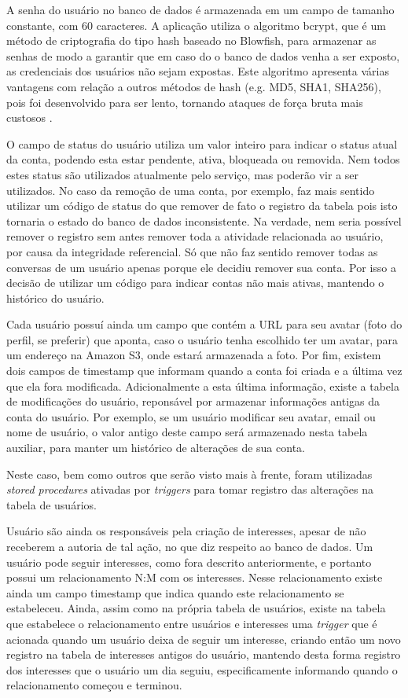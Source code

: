 \documentclass[diss]{template/setrem}
\begin{document}
A senha do usuário no banco de dados é armazenada em um campo de tamanho constante, com 60 caracteres. A aplicação utiliza o algoritmo bcrypt, que é um método de criptografia do tipo hash baseado no Blowfish, para armazenar as senhas de modo a garantir que em caso do o banco de dados venha a ser exposto, as credenciais dos usuários não sejam expostas. Este algoritmo apresenta várias vantagens com relação a outros métodos de hash (e.g. MD5, SHA1, SHA256), pois foi desenvolvido para ser lento, tornando ataques de força bruta mais custosos \citep{Hale2010}.

O campo de status do usuário utiliza um valor inteiro para indicar o status atual da conta, podendo esta estar pendente, ativa, bloqueada ou removida. Nem todos estes status são utilizados atualmente pelo serviço, mas poderão vir a ser utilizados. No caso da remoção de uma conta, por exemplo, faz mais sentido utilizar um código de status do que remover de fato o registro da tabela pois isto tornaria o estado do banco de dados inconsistente. Na verdade, nem seria possível remover o registro sem antes remover toda a atividade relacionada ao usuário, por causa da integridade referencial. Só que não faz sentido remover todas as conversas de um usuário apenas porque ele decidiu remover sua conta. Por isso a decisão de utilizar um código para indicar contas não mais ativas, mantendo o histórico do usuário.

Cada usuário possuí ainda um campo que contém a URL para seu avatar (foto do perfil, se preferir) que aponta, caso o usuário tenha escolhido ter um avatar, para um endereço na Amazon S3, onde estará armazenada a foto. Por fim, existem dois campos de timestamp que informam quando a conta foi criada e a última vez que ela fora modificada. Adicionalmente a esta última informação, existe a tabela de modificações do usuário, reponsável por armazenar informações antigas da conta do usuário. Por exemplo, se um usuário modificar seu avatar, email ou nome de usuário, o valor antigo deste campo será armazenado nesta tabela auxiliar, para manter um histórico de alterações de sua conta.

Neste caso, bem como outros que serão visto mais à frente, foram utilizadas \emph{stored procedures} ativadas por \emph{triggers} para tomar registro das alterações na tabela de usuários.

Usuário são ainda os responsáveis pela criação de interesses, apesar de não receberem a autoria de tal ação, no que diz respeito ao banco de dados. Um usuário pode seguir interesses, como fora descrito anteriormente, e portanto possui um relacionamento N:M com os interesses. Nesse relacionamento existe ainda um campo timestamp que indica quando este relacionamento se estabeleceu. Ainda, assim como na própria tabela de usuários, existe na tabela que estabelece o relacionamento entre usuários e interesses uma \emph{trigger} que é acionada quando um usuário deixa de seguir um interesse, criando então um novo registro na tabela de interesses antigos do usuário, mantendo desta forma registro dos interesses que o usuário um dia seguiu, especificamente informando quando o relacionamento começou e terminou.
\end{document}
